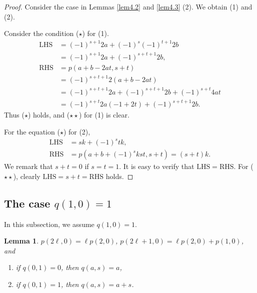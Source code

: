 \documentclass[12pt]{amsart}
\newtheorem{lemm}[thm]{Lemma}
\theoremstyle{definition}
\begin{document}
\begin{proof}
  Consider the case in Lemmas \ref{lem4.2} and \ref{lem4.3} (2).
  We obtain (1) and (2).

  Consider the condition ($\star$) for (1).
  \begin{align*}
    \mathrm{LHS} &= (-1)^{s+1}2a+(-1)^s(-1)^{t+1}2b\\
                 &= (-1)^{s+1}2a+(-1)^{s+t+1}2b,\\
    \mathrm{RHS} &= p(a+b-2at,s+t)\\
                 &= (-1)^{s+t+1}2(a+b-2at)\\
                 &= (-1)^{s+t+1}2a+(-1)^{s+t+1}2b+(-1)^{s+t}4at\\
                 &= (-1)^{s+t}2a(-1+2t)+(-1)^{s+t+1}2b.
  \end{align*}
  Thus ($\star$) holds, and ($\star\star$) for (1) is clear.

  For the equation ($\star$) for (2),
  \begin{align*}
    \mathrm{LHS} &= sk+(-1)^stk,\\
    \mathrm{RHS} &= p(a+b+(-1)^skst,s+t)
                     = (s+t)k.
  \end{align*}
  We remark that $s+t=0$ if $s=t=1$.
  It is easy to verify that $\mathrm{LHS}= \mathrm{RHS}$.
  For ($\star\star$), clearly $\mathrm{LHS}=s+t=\mathrm{RHS}$ holds.
\end{proof}

\subsection{The case $q(1,0)=1$}
In this subsection, we assume $q(1,0)=1$.

\begin{lemm}\label{lem4.6}
  $p(2\ell,0)=\ell p(2,0)$,
  $p(2\ell +1, 0)=\ell p(2,0)+p(1,0)$, and
  \begin{enumerate}[{\rm (1)}]
    \item if $q(0,1)=0$, then $q(a,s)=a$,
    \item if $q(0,1)=1$, then $q(a,s)=a+s$.
  \end{enumerate}
\end{lemm}
\end{document}

